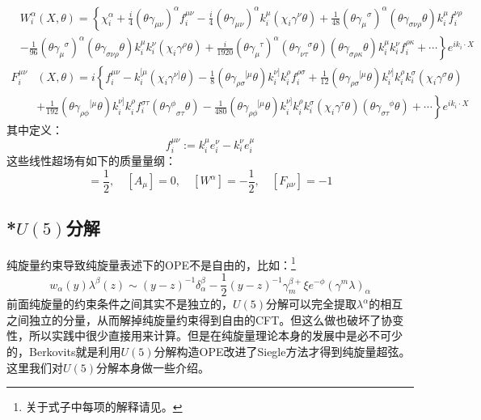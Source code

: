 \begin{equation}
	\label{eq:5.50}
	\begin{aligned}
		&W_i^\alpha (X, \theta) =
		\left\{
		\chi_i^\alpha
		+ \frac{i}{4} (\theta \gamma_{\mu\nu})^\alpha f_i^{\mu\nu}
		- \frac{i}{4} (\theta \gamma_{\mu\nu})^\alpha k_i^\mu (\chi_i \gamma^\nu \theta)+\frac{1}{48}(\theta{\gamma_\mu}^\sigma)^\alpha(\theta\gamma_{\sigma\nu\rho}\theta)k^\mu_i f^{\nu\rho}_i\right.\\
		& \left.- \frac{1}{96} (\theta \gamma_\mu^{\phantom{\mu} \sigma})^\alpha (\theta \gamma_{\sigma\nu\rho} \theta) k_i^\mu k_i^\nu (\chi_i \gamma^\rho \theta)
		+ \frac{i}{1920} (\theta \gamma_\mu^{\phantom{\mu} \tau})^\alpha (\theta \gamma_{\nu\tau}^{\phantom{\nu\tau} \sigma} \theta) (\theta \gamma_{\sigma\rho\kappa} \theta) k_i^\mu k_i^\nu f_i^{\rho\kappa}
		+ \cdots
		\right\} e^{ik_i \cdot X}
	\end{aligned}
\end{equation}
\begin{equation}
	\label{eq:5.51}
	\begin{aligned}
		F_i^{\mu\nu} &(X, \theta) = i
		\left\{
		f_i^{\mu\nu}
		- k_i^{[\mu} (\chi_i \gamma^{\nu]} \theta)
		- \frac{1}{8} (\theta \gamma_{\rho\sigma}^{\phantom{\rho\sigma} [\mu} \theta) k_i^{\nu]} k_i^\rho f_i^{\rho\sigma}
		+ \frac{1}{12} (\theta \gamma_{\rho\sigma}^{\phantom{\rho\sigma} [\mu} \theta) k_i^{\nu]} k_i^\rho k_i^\sigma (\chi_i \gamma^\sigma \theta)\right.\\
		&\left.+\frac{1}{192}(\theta{\gamma_{\rho\phi}}^{[\mu}\theta)k_i^{\nu]}k_i^\rho f_i^{\sigma\tau}(\theta{\gamma^\phi}_{\sigma\tau}\theta)
		- \frac{1}{480} (\theta \gamma_{\rho\phi}^{\phantom{\rho\phi} [\mu} \theta) k_i^{\nu]} k_i^\rho k_i^\sigma(\chi_i\gamma^\tau\theta) (\theta \gamma_{\sigma\tau}^{\phantom{\sigma\tau} \phi} \theta)
		+ \cdots
		\right\} e^{ik_i \cdot X}
	\end{aligned}
\end{equation}
其中定义：
\begin{equation}
	f_i^{\mu\nu}:=k_i^\mu e_i^\nu-k_i^\nu e_i^\mu
\end{equation}
这些线性超场有如下的质量量纲：
\begin{equation}
	[A_\alpha]=\frac{1}{2},\quad[A_\mu]=0,\quad[W^\alpha]=-\frac{1}{2},\quad[F_{\mu\nu}]=-1
\end{equation}
\subsection{*$U(5)$分解}
纯旋量约束导致纯旋量表述下的OPE不是自由的，比如：\footnote{关于式子中每项的解释请见\cite{Berkovits:2000fe}。}
\begin{equation}
	w_\alpha(y)\lambda^\beta(z)\sim(y-z)^{-1}\delta_\alpha^\beta-\frac{1}{2}(y-z)^{-1}\gamma_m^{\beta+}\xi e^{-\phi}(\gamma^m\lambda)_\alpha
\end{equation}
前面纯旋量的约束条件之间其实不是独立的，$U(5)$分解可以完全提取$\lambda^\alpha$的相互之间独立的分量，从而解掉纯旋量约束得到自由的CFT。但这么做也破坏了协变性，所以实践中很少直接用来计算。但是在纯旋量理论本身的发展中是必不可少的，Berkovits就是利用$U(5)$分解构造OPE改进了Siegle方法才得到纯旋量超弦。这里我们对$U(5)$分解本身做一些介绍。

